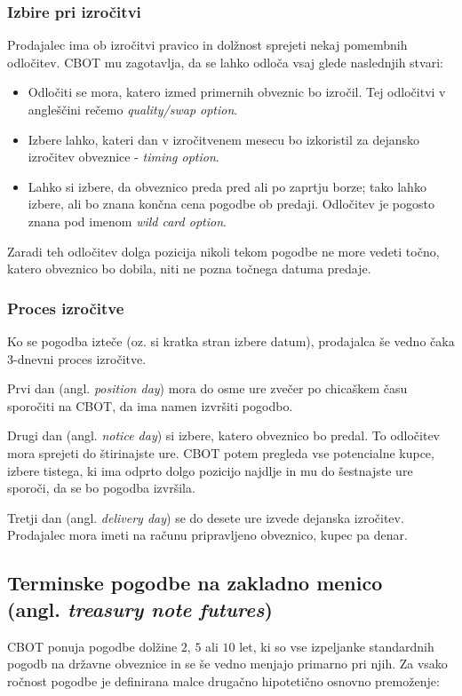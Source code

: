 \documentclass[a4paper, 11pt]{article}
\begin{document}
\subsubsection{Izbire pri izročitvi}
Prodajalec ima ob izročitvi pravico in dolžnost sprejeti nekaj pomembnih odločitev. CBOT mu 
zagotavlja, da se lahko odloča vsaj glede naslednjih stvari:

\begin{itemize}
    \item Odločiti se mora, katero izmed primernih obveznic bo izročil. Tej odločitvi v angleščini 
            rečemo \textit{quality/swap option}.
    \item Izbere lahko, kateri dan v izročitvenem mesecu bo izkoristil za dejansko izročitev
            obveznice - \textit{timing option}.
    \item Lahko si izbere, da obveznico preda pred ali po zaprtju borze; tako lahko izbere, ali bo 
            znana končna cena pogodbe ob predaji. Odločitev je pogosto znana pod imenom
            \textit{wild card option}. 
\end{itemize}

Zaradi teh odločitev dolga pozicija nikoli tekom pogodbe ne more vedeti točno, katero obveznico bo
dobila, niti ne pozna točnega datuma predaje.

\subsubsection{Proces izročitve}
Ko se pogodba izteče (oz. si kratka stran izbere datum), prodajalca še vedno čaka 3-dnevni proces 
izročitve. 

Prvi dan (angl. \textit{position day}) mora do osme ure zvečer po chicaškem času sporočiti na 
CBOT, da ima namen izvršiti pogodbo. 

Drugi dan (angl. \textit{notice day}) si izbere, katero obveznico bo predal. To odločitev mora 
sprejeti do štirinajste ure. CBOT potem pregleda vse potencialne kupce, izbere tistega, ki 
ima odprto dolgo pozicijo najdlje in mu do šestnajste ure sporoči, da se bo pogodba izvršila. 

Tretji dan (angl. \textit{delivery day}) se do desete ure izvede dejanska izročitev. Prodajalec 
mora imeti na računu pripravljeno obveznico, kupec pa denar. 


\subsection{Terminske pogodbe na zakladno menico \\ (angl. \textit{treasury note futures})}
CBOT ponuja pogodbe dolžine $2$, $5$ ali $10$ let, ki so vse izpeljanke standardnih pogodb na 
državne obveznice in se še vedno menjajo primarno pri njih. Za vsako ročnost pogodbe je 
definirana malce drugačno hipotetično osnovno premoženje:
\end{document}
